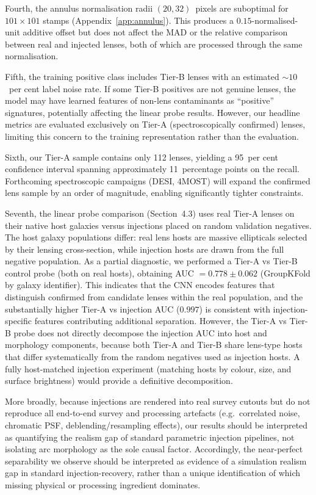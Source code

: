 \documentclass[fleqn,usenatbib]{mnras}
\begin{document}
Fourth, the annulus normalisation radii $(20, 32)$~pixels are suboptimal for $101 \times 101$ stamps (Appendix~\ref{app:annulus}).  This produces a $0.15$-normalised-unit additive offset but does not affect the MAD or the relative comparison between real and injected lenses, both of which are processed through the same normalisation.

Fifth, the training positive class includes Tier-B lenses with an estimated $\sim\!10$~per cent label noise rate.  If some Tier-B positives are not genuine lenses, the model may have learned features of non-lens contaminants as ``positive'' signatures, potentially affecting the linear probe results.  However, our headline metrics are evaluated exclusively on Tier-A (spectroscopically confirmed) lenses, limiting this concern to the training representation rather than the evaluation.

Sixth, our Tier-A sample contains only 112 lenses, yielding a 95~per cent confidence interval spanning approximately 11~percentage points on the recall.  Forthcoming spectroscopic campaigns (DESI, 4MOST) will expand the confirmed lens sample by an order of magnitude, enabling significantly tighter constraints.

Seventh, the linear probe comparison (Section~4.3) uses real Tier-A lenses on their native host galaxies versus injections placed on random validation negatives.  The host galaxy populations differ: real lens hosts are massive ellipticals selected by their lensing cross-section, while injection hosts are drawn from the full negative population.  As a partial diagnostic, we performed a Tier-A vs Tier-B control probe (both on real hosts), obtaining AUC $= 0.778 \pm 0.062$ (GroupKFold by galaxy identifier).  This indicates that the CNN encodes features that distinguish confirmed from candidate lenses within the real population, and the substantially higher Tier-A vs injection AUC ($0.997$) is consistent with injection-specific features contributing additional separation.  However, the Tier-A vs Tier-B probe does not directly decompose the injection AUC into host and morphology components, because both Tier-A and Tier-B share lens-type hosts that differ systematically from the random negatives used as injection hosts.  A fully host-matched injection experiment (matching hosts by colour, size, and surface brightness) would provide a definitive decomposition.

More broadly, because injections are rendered into real survey cutouts but do not reproduce all end-to-end survey and processing artefacts (e.g.\ correlated noise, chromatic PSF, deblending/resampling effects), our results should be interpreted as quantifying the realism gap of standard parametric injection pipelines, not isolating arc morphology as the sole causal factor.  Accordingly, the near-perfect separability we observe should be interpreted as evidence of a simulation realism gap in standard injection-recovery, rather than a unique identification of which missing physical or processing ingredient dominates.
\end{document}
